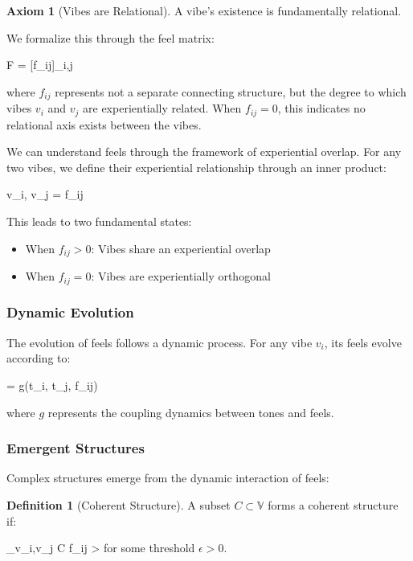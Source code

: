 \documentclass{article}
\let\oldequation\equation
\let\endoldequation\endequation
\renewenvironment{equation}{%
    \noindent\vspace{-\parskip}\vspace{-\baselineskip}%
    \oldequation
}{%
    \endoldequation
    \noindent\vspace{-\parskip}\vspace{-\baselineskip}%
}
\theoremstyle{definition}
\theoremstyle{axiom}
\theoremstyle{theorem}
\theoremstyle{lemma}
\theoremstyle{proposition}
\newtheorem{definition}{Definition}      %
\newtheorem{axiom}{Axiom}
\begin{document}
\begin{axiom}[Vibes are Relational]
A vibe's existence is fundamentally relational.
\end{axiom}

We formalize this through the feel matrix:

\begin{equation}
F = [f_{ij}]_{i,j \in {}}
\end{equation}

where $f_{ij}$ represents not a separate connecting structure, but the degree to which vibes $v_i$ and $v_j$ are experientially related. When $f_{ij} = 0$, this indicates no relational axis exists between the vibes.

We can understand feels through the framework of experiential overlap. For any two vibes, we define their experiential relationship through an inner product:

\begin{equation}
\langle v_i, v_j \rangle = f_{ij}
\end{equation}

This leads to two fundamental states:

\begin{itemize}
\item When $f_{ij} > 0$: Vibes share an experiential overlap
\item When $f_{ij} = 0$: Vibes are experientially orthogonal
\end{itemize}

\subsubsection{Dynamic Evolution}

The evolution of feels follows a dynamic process. For any vibe $v_i$, its feels evolve according to:

\begin{equation}
 = g(t_i, t_j, f_{ij})
\end{equation}

where $g$ represents the coupling dynamics between tones and feels.

\subsubsection{Emergent Structures}

Complex structures emerge from the dynamic interaction of feels:

\begin{definition}[Coherent Structure]
A subset $C \subset \mathbb{V}$ forms a coherent structure if:
\begin{equation}
\min_{v_i,v_j \in C} f_{ij} > \epsilon
\end{equation}
for some threshold $\epsilon > 0$.
\end{definition}
\end{document}
